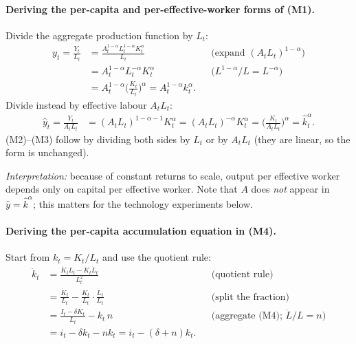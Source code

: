 \paragraph{Deriving the per-capita and per-effective-worker forms of (M1).}
Divide the aggregate production function by $L_t$:
\begin{align*}
y_t=\frac{Y_t}{L_t} &= \frac{A_t^{1-\alpha}L_t^{1-\alpha}K_t^{\alpha}}{L_t} && \text{(expand $(A_tL_t)^{1-\alpha}$)}\\
&= A_t^{1-\alpha}L_t^{-\alpha}K_t^{\alpha} && \text{($L^{1-\alpha}/L = L^{-\alpha}$)}\\
&= A_t^{1-\alpha}\Big(\frac{K_t}{L_t}\Big)^{\alpha} = A_t^{1-\alpha}k_t^{\alpha}.
\end{align*}
Divide instead by effective labour $A_tL_t$:
\begin{align*}
\hat y_t = \frac{Y_t}{A_tL_t} &= (A_tL_t)^{1-\alpha-1}K_t^{\alpha} = (A_tL_t)^{-\alpha}K_t^{\alpha} = \Big(\frac{K_t}{A_tL_t}\Big)^{\alpha} = \hat k_t^{\alpha}.
\end{align*}
(M2)--(M3) follow by dividing both sides by $L_t$ or by $A_tL_t$ (they are linear, so the form is unchanged).

\textit{Interpretation:} because of constant returns to scale, output per effective worker depends only on capital per effective worker. Note that $A$ does \emph{not} appear in $\hat y=\hat k^\alpha$; this matters for the technology experiments below.

\paragraph{Deriving the per-capita accumulation equation in (M4).} Start from $k_t=K_t/L_t$ and use the quotient rule:
\begin{align*}
\dot k_t &= \frac{\dot K_tL_t - K_t\dot L_t}{L_t^2} && \text{(quotient rule)}\\
&= \frac{\dot K_t}{L_t} - \frac{K_t}{L_t}\cdot\frac{\dot L_t}{L_t} && \text{(split the fraction)}\\
&= \frac{I_t-\delta K_t}{L_t} - k_t\, n && \text{(aggregate (M4); $\dot L/L=n$)}\\
&= i_t-\delta k_t - nk_t = i_t-(\delta+n)k_t .
\end{align*}

